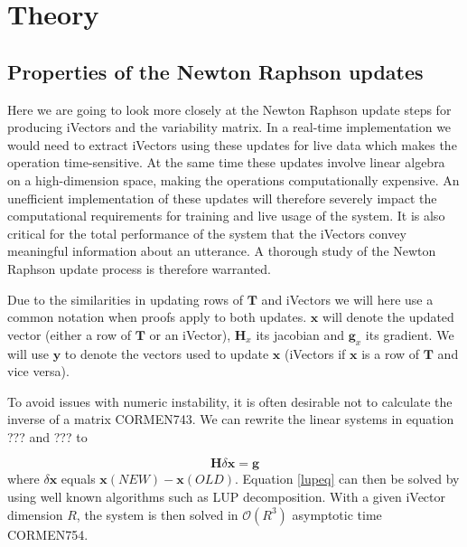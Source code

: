 \chapter{Theory}
\label{sect:Theory}

\section{Properties of the Newton Raphson updates}

Here we are going to look more closely at the Newton Raphson update steps for producing iVectors and the variability matrix. In a real-time implementation we would need to extract iVectors using these updates for live data which makes the operation time-sensitive. At the same time these updates involve linear algebra on a high-dimension space, making the operations computationally expensive. An unefficient implementation of these updates will therefore severely impact the computational requirements for training and live usage of the system. It is also critical for the total performance of the system that the iVectors convey meaningful information about an utterance. A thorough study of the Newton Raphson update process is therefore warranted. 

Due to the similarities in updating rows of $\mathbf{T}$ and iVectors we will here use a common notation when proofs apply to both updates. $\mathbf{x}$ will denote the updated vector (either a row of $\mathbf{T}$ or an iVector), $\mathbf{H}_x$ its jacobian and $\mathbf{g}_x$ its gradient. We will use $\mathbf{y}$ to denote the vectors used to update $\mathbf{x}$ (iVectors if $\mathbf{x}$ is a row of $\mathbf{T}$ and vice versa).

To avoid issues with numeric instability, it is often desirable not to calculate the inverse of a matrix CORMEN743. We can rewrite the linear systems in equation ??? and ??? to

\begin{equation}\label{lupeq}
\mathbf{H}\delta\mathbf{x} = \mathbf{g}
\end{equation}
where $\delta\mathbf{x}$ equals $\mathbf{x}(NEW)-\mathbf{x}(OLD)$. Equation \ref{lupeq} can then be solved by using well known algorithms such as LUP decomposition. With a given iVector dimension $R$, the system is then solved in $\mathcal{O}(R^3)$ asymptotic time CORMEN754. 

